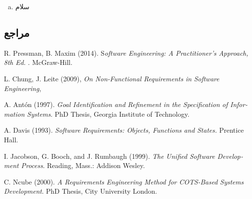 {\begin{enumerate}[a)]
\begin{itemize}
\begin{itemize}
		\end{itemize}
	\end{itemize}
	
	با توجه به همه این موارد، می‌توان تا حد خوبی به \textbf{اهمیت نیازمندی‌های غیرکارکردی در سامانه‌های نرم‌افزاری} پی برد. از‌ آن‌جایی که کیفیت یکی از مهم‌ترین -و شاید مهم‌ترین-  اصل در تولید نرم‌افزار است و نیازمندی‌های غیرکارکردی دقیقا بر روی کیفیت محصول نظارت دارند، توجه به آن‌ها اهمیتی ویژه‌ای در سامانه‌های نرم‌افزاری دارد. این نیازمندی‌ها ناظر بر «چگونگی» کارکرد سیستم هستند و میزان «خوب بودن» آن را مشخص می‌کنند؛ در عین حال مشخص کردن آن‌ها معمولا برای مشتری یا ذی‌نفعان دشوار است. در نتیجه توجه به آن‌ها در سامانه‌های نرم‌افزاری اهمیت بالایی دارد.
	
	\item سلام
\end{enumerate}
	

\subsection*{مراجع}

\begin{latin}
	\begingroup
	\renewcommand{\section}[2]{}%
	
\begin{thebibliography}{9}

	R. Pressman,   B. Maxim (2014).
	S\textit{oftware Engineering: A Practitioner’s Approach, 8th Ed. }.
	McGraw-Hill.

	
	
	L. Chung,  J. Leite (2009),
	\textit{On Non-Functional Requirements in Software Engineering},
	
	
	A. Antón (1997).
	\textit{Goal Identification and Refinement in
	the Specification of Information Systems}. PhD Thesis,
	Georgia Institute of Technology.
	
	A. Davis (1993). \textit{Software Requirements: Objects, Functions
	and States.} Prentice Hall.

	I. Jacobson, G. Booch, and J. Rumbaugh (1999). \textit{The
	Unified Software Development Process}. Reading,
	Mass.: Addison Wesley.
	
	C. Ncube (2000). \textit{A Requirements Engineering Method
	for COTS-Based Systems Development}. PhD Thesis,
	City University London.
	

\end{thebibliography}
\end{latin}}
